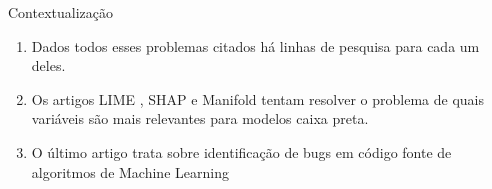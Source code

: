 \begin{frame}
	\begin{block}{Contextualização}
		\begin{enumerate}
			\item Dados todos esses problemas citados há linhas de pesquisa para cada um deles.
			\item Os artigos LIME \cite{LIME}, SHAP \cite{SHAP} e Manifold \cite{Manifold} tentam resolver o problema de quais variáveis são mais relevantes para modelos caixa preta.
			\item O último artigo \cite{Metamorphic} trata sobre identificação de bugs em código fonte de algoritmos de Machine Learning
		\end{enumerate}
	\end{block}
\end{frame}

